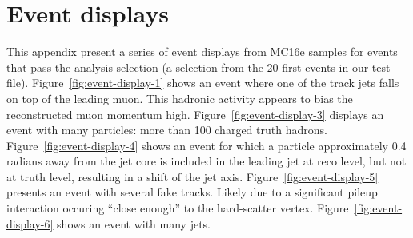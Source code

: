 \section{Event displays}
\label{app:event-displays}
This appendix present a series of event displays from MC16e \powpyt{} samples for events that pass the analysis selection (a selection from the 20 first events in our test file).
Figure~\ref{fig:event-display-1} shows an event where one of the track jets falls on top of the leading muon. This hadronic activity appears to bias the reconstructed muon momentum high. 
Figure~\ref{fig:event-display-3} displays an event with many particles: more than 100 charged truth hadrons.
Figure~\ref{fig:event-display-4} shows an event for which a particle approximately 0.4 radians away from the jet core is included in the leading jet at reco level, but not at truth level, resulting in a shift of the jet axis.
Figure~\ref{fig:event-display-5} presents an event with several fake tracks. Likely due to a significant pileup interaction occuring ``close enough'' to the hard-scatter vertex.
Figure~\ref{fig:event-display-6} shows an event with many jets.


